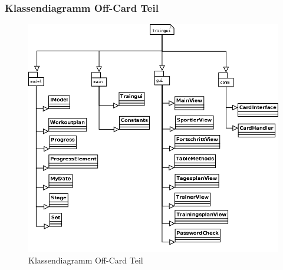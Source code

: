 \subsubsection*{Klassendiagramm Off-Card Teil}





\begin{figure}[h]
\includegraphics[width=1\hsize]{./images/Diagramm1.png}
\caption{Klassendiagramm Off-Card Teil}
\label{off-card}
\end{figure}

